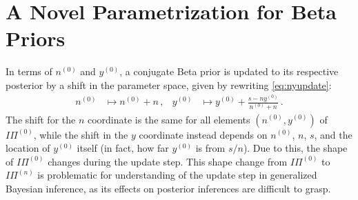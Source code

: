 \documentclass[runningheads,a4paper]{llncs}
\newcommand{\uz}{^{(0)}} %
\newcommand{\un}{^{(n)}} %
\def\yz{y\uz}
\def\nz{n\uz}
\def\PZ{I\!\!\Pi\uz}
\def\PN{I\!\!\Pi\un}
\begin{document}
\section{A Novel Parametrization for Beta Priors}
\label{sec:miksworld}

In terms of $\nz$ and $\yz$, %
a conjugate Beta prior is updated to its respective posterior by a shift in the parameter space,
given by rewriting \eqref{eq:nyupdate}:
\begin{align*}
\nz &\mapsto \nz + n\,, &
\yz &\mapsto %
             \yz + \frac{s - n \yz}{\nz+n}\,.
\end{align*}
The shift for the $n$ coordinate is the same for all elements $(\nz,\yz)$ of $\PZ$,
while the shift in the $y$ coordinate instead depends on $\nz$, $n$, $s$, and the location of $\yz$ itself
(in fact, how far $\yz$ is from $s/n$).
Due to this, the shape of $\PZ$ changes during the update step.
This shape change from $\PZ$ to $\PN$ is problematic for understanding of the update step in generalized Bayesian inference,
as its effects on posterior inferences are difficult to grasp.
\end{document}
